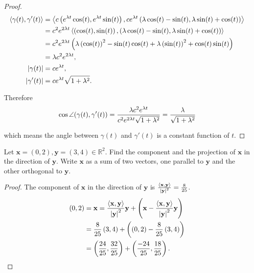 \begin{proof}
	\begin{align*}
		\left\langle{\gamma(t), \gamma'(t)}\right\rangle & = \left\langle{c\left({e^{\lambda t}\cos(t), e^{\lambda t}\sin(t)}\right), ce^{\lambda t}\left({\lambda\cos(t) - \sin(t), \lambda \sin(t) + \cos(t)}\right)}\right\rangle \\
		                                  & = c^{2}e^{2\lambda t}\left\langle{\left({\cos(t), \sin(t)}\right), \left({\lambda \cos(t) - \sin(t), \lambda \sin(t) + \cos(t)}\right)}\right\rangle                      \\
		                                  & = c^{2}e^{2\lambda t}\left({\lambda \left({\cos(t)}\right)^{2} - \sin(t)\cos(t) + \lambda \left({\sin(t)}\right)^{2} + \cos(t)\sin(t)}\right)                     \\
		                                  & = \lambda c^{2}e^{2\lambda t},                                                                                                               \\
		\left\vert{\gamma(t)}\right\vert                   & = ce^{\lambda t},                                                                                                                            \\
		\left\vert{\gamma'(t)}\right\vert                  & = ce^{\lambda t}\sqrt{1 + \lambda^{2}}.
	\end{align*}

	Therefore
	\begin{align*}
		\cos \angle{\left({\gamma(t), \gamma'(t)}\right)} = \frac{\lambda c^{2}e^{\lambda t}}{c^{2}e^{2\lambda t}\sqrt{1 + \lambda^{2}}} = \frac{\lambda}{\sqrt{1 + \lambda^{2}}}
	\end{align*}

	which means the angle between $\gamma(t)$ and $\gamma'(t)$ is a constant function of $t$.
\end{proof}

\begin{exercise}{1.17}
	Let $\mathbf{x} = (0, 2), \mathbf{y} = (3, 4) \in \mathbb{R}^{2}$. Find the component and the projection of $\mathbf{x}$ in the direction of $\mathbf{y}$. Write $\mathbf{x}$ as a sum of two vectors, one parallel to $\mathbf{y}$ and the other orthogonal to $\mathbf{y}$.
\end{exercise}

\begin{proof}
	The component of $\mathbf{x}$ in the direction of $\mathbf{y}$ is $\frac{\left\langle{\mathbf{x}, \mathbf{y}}\right\rangle}{\left\vert{\mathbf{y}}\right\vert^{2}} = \frac{8}{25}$.
	\begin{align*}
		\left({0,2}\right) & = \mathbf{x} = \frac{\left\langle{\mathbf{x}, \mathbf{y}}\right\rangle}{\left\vert{\mathbf{y}}\right\vert^{2}}\mathbf{y} + \left(\mathbf{x} - \frac{\left\langle{\mathbf{x}, \mathbf{y}}\right\rangle}{\left\vert{\mathbf{y}}\right\vert^{2}}\mathbf{y}\right) \\
		            & = \frac{8}{25}\left({3, 4}\right) + \left(\left({0, 2}\right) - \frac{8}{25}\left({3, 4}\right)\right)                                                                                                              \\
		            & = \left({\frac{24}{25}, \frac{32}{25}}\right) + \left({\frac{-24}{25}, \frac{18}{25}}\right).\qedhere
	\end{align*}
\end{proof}

